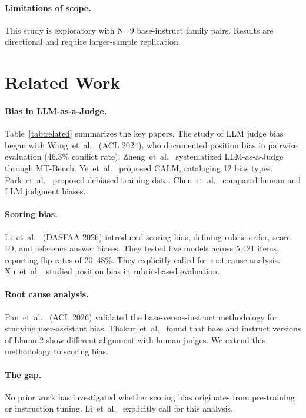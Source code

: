 \documentclass[11pt,a4paper]{article}
\begin{document}
\paragraph{Limitations of scope.} This study is exploratory with N=9 base-instruct family pairs. Results are directional and require larger-sample replication.

\section{Related Work}

\paragraph{Bias in LLM-as-a-Judge.}
Table~\ref{tab:related} summarizes the key papers. The study of LLM judge bias began with Wang~et~al.~\cite{wang2023large} (ACL 2024), who documented position bias in pairwise evaluation (46.3\% conflict rate). Zheng~et~al.~\cite{zheng2023judging} systematized LLM-as-a-Judge through MT-Bench. Ye~et~al.~\cite{ye2024justice} proposed CALM, cataloging 12 bias types. Park~et~al.~\cite{park2024offsetbias} proposed debiased training data. Chen~et~al.~\cite{chen2024humans} compared human and LLM judgment biases.

\paragraph{Scoring bias.}
Li~et~al.~\cite{li2025scoring} (DASFAA 2026) introduced scoring bias, defining rubric order, score ID, and reference answer biases. They tested five models across 5,421 items, reporting flip rates of 20--48\%. They explicitly called for root cause analysis. Xu~et~al.~\cite{xu2026position} studied position bias in rubric-based evaluation.

\paragraph{Root cause analysis.}
Pan~et~al.~\cite{pan2025user} (ACL 2026) validated the base-versus-instruct methodology for studying user-assistant bias. Thakur~et~al.~\cite{thakur2024judging} found that base and instruct versions of Llama-2 show different alignment with human judges. We extend this methodology to scoring bias.

\paragraph{The gap.}
No prior work has investigated whether scoring bias originates from pre-training or instruction tuning. Li~et~al.~\cite{li2025scoring} explicitly call for this analysis.
\end{document}
